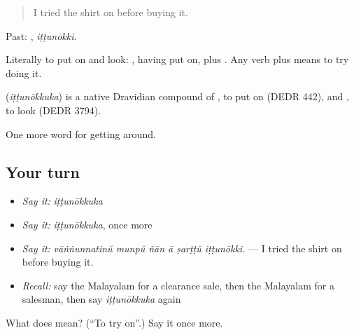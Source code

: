 \begin{quote}
I tried the shirt on before buying it.
\end{quote}

Past: , \emph{iṭṭunōkki}.

Literally to put on and look: , having put on, plus . Any verb plus  means to try doing it.

\begin{cousinweb}
\textbf{} (\emph{iṭṭunōkkuka}) is a native Dravidian compound of , to put on (DEDR 442), and , to look (DEDR 3794).
\end{cousinweb}

\begin{grammarlens}[title={What you've built}]
One more word for getting around.
\end{grammarlens}

\subsection*{Your turn}
\begin{itemize}
\raggedright
  \item \emph{Say it:} \emph{iṭṭunōkkuka}
  \item \emph{Say it:} \emph{iṭṭunōkkuka}, once more
  \item \emph{Say it:} \emph{vāṅṅunnatinŭ munpŭ ñān ā ṣarṭṭŭ iṭṭunōkki.} — I tried the shirt on before buying it.
  \item \emph{Recall:} say the Malayalam for a clearance sale, then the Malayalam for a salesman, then say \emph{iṭṭunōkkuka} again
\end{itemize}

\begin{tcolorbox}[breakable,colback=teal!4,colframe=teal!35!black,title={Before you move on}]
What does  mean? (\textquotedblleft{}To try on\textquotedblright{}.) Say it once more.
\end{tcolorbox}
